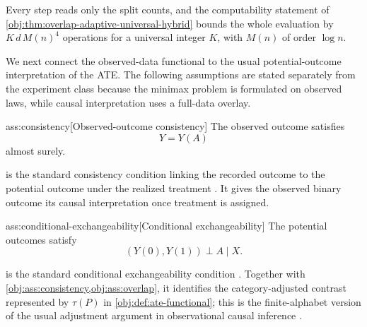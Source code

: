 Every step reads only the split counts, and the computability statement of \cref{obj:thm:overlap-adaptive-universal-hybrid} bounds the whole evaluation by \(K\,d\,M(n)^4\) operations for a universal integer \(K\), with \(M(n)\) of order \(\log n\).

We next connect the observed-data functional to the usual potential-outcome interpretation of the ATE. The following assumptions are stated separately from the experiment class because the minimax problem is formulated on observed laws, while causal interpretation uses a full-data overlay.

\begin{assumptionv}{ass:consistency}[Observed-outcome consistency]
The observed outcome satisfies
\[
Y=Y(A)
\]
almost surely.
\end{assumptionv}

 is the standard consistency condition linking the recorded outcome to the potential outcome under the realized treatment \citep{ZengBalakrishnanHanKennedy2024}. It gives the observed binary outcome its causal interpretation once treatment is assigned.

\begin{assumptionv}{ass:conditional-exchangeability}[Conditional exchangeability]
The potential outcomes satisfy
\[
(Y(0),Y(1))\perp A\mid X .
\]
\end{assumptionv}

 is the standard conditional exchangeability condition \citep{ZengBalakrishnanHanKennedy2024}. Together with \cref{obj:ass:consistency,obj:ass:overlap}, it identifies the category-adjusted contrast represented by \(\tau(P)\) in \cref{obj:def:ate-functional}; this is the finite-alphabet version of the usual adjustment argument in observational causal inference \citep{Rubin1974,RosenbaumRubin1983}.
